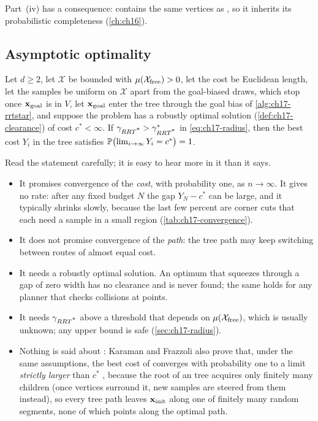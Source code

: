 Part~(iv) has a consequence: \rrtstar contains the same vertices as \rrt, so
it inherits its probabilistic
completeness (\cref{ch:ch16}).

\subsection{Asymptotic optimality}
\label{sec:ch17-ao}

\begin{theorem}
\label{thm:ch17-ao}
Let $d\ge2$, let $\mathcal{X}$ be bounded with $\mu(\mathcal{X}_{\mathrm{free}})>0$, let the cost
be Euclidean length, let the samples be uniform on $\mathcal{X}$ apart
from the goal-biased draws, which stop once $\mathbf{x}_{\mathrm{goal}}$ is in $V$,
let $\mathbf{x}_{\mathrm{goal}}$ enter the tree through the goal bias of
\cref{alg:ch17-rrtstar}, and suppose the problem has a robustly optimal solution
(\cref{def:ch17-clearance}) of cost $c^*<\infty$. If
$\gamma_{RRT\textsuperscript{*}}>\gamma^*_{RRT\textsuperscript{*}}$ in \cref{eq:ch17-radius}, then the
best cost $Y_i$ in the tree satisfies
$\mathbb{P}\bigl(\lim_{i\to\infty}Y_i=c^*\bigr)=1$.
\end{theorem}

Read the statement carefully; it is easy to hear more in it than it says.
\begin{itemize}
  \item It promises convergence of the \emph{cost}, with probability one,
  as $n\to\infty$. It gives no rate: after any fixed budget $N$ the gap
  $Y_N-c^*$ can be large, and it typically shrinks slowly, because the last
  few percent are corner cuts that each need a sample in a small region
  (\cref{tab:ch17-convergence}).
  \item It does not promise convergence of the \emph{path}: the tree path
  may keep switching between routes of almost equal cost.
  \item It needs a robustly optimal solution. An optimum that squeezes
  through a gap of zero width has no clearance and is never found; the same
  holds for any planner that checks collisions at points.
  \item It needs $\gamma_{RRT\textsuperscript{*}}$ above a threshold that depends on
  $\mu(\mathcal{X}_{\mathrm{free}})$, which is usually unknown; any upper bound is safe
  (\cref{sec:ch17-radius}).
  \item Nothing is said about \rrt: Karaman and Frazzoli also prove that,
  under the same assumptions, the best cost of \rrt converges with
  probability one to a limit \emph{strictly larger} than $c^*$
  \cite{karaman2011sampling}, because the root of an \rrt tree acquires only
  finitely many children (once vertices surround it, new samples are steered
  from them instead), so every tree path leaves $\mathbf{x}_{\mathrm{init}}$ along one
  of finitely many random segments, none of which points along the optimal
  path.
\end{itemize}

